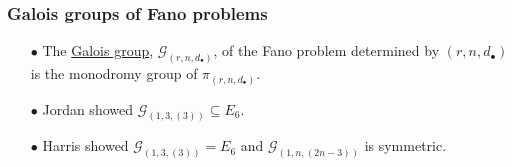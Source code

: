 \documentclass{beamer}
\newcommand{\blue}[1]{{\color{black!10!blue}\underline{#1}}}
\begin{document}
\begin{frame}
\frametitle{Galois groups of Fano problems}
\hspace{-.65cm}
\begin{minipage}{.73\textwidth}
\begin{enumerate}
\item[$\bullet$] The \blue{Galois group}, $\mathcal{G}_{(r,n,d_\bullet)}$, of the Fano problem determined by $(r,n,d_\bullet)$ is the monodromy group of $\pi_{(r,n,d_\bullet)}$.

\vspace{.1cm}

\item[$\bullet$] Jordan showed $\mathcal{G}_{(1,3,(3))}\subseteq E_6$.

\vspace{.1cm}

\item[$\bullet$] Harris showed $\mathcal{G}_{(1,3,(3))} = E_6$ and $\mathcal{G}_{(1,n,(2n-3))}$ is symmetric.

\vspace{.1cm}


\end{enumerate}
\end{minipage}
\end{frame}
\end{document}
